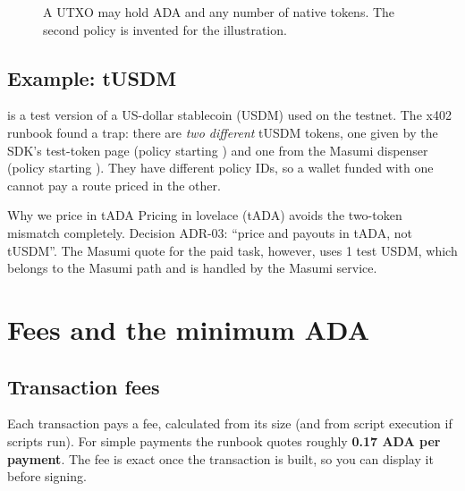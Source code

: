 \begin{figure}[h]
\centering
{}
\caption{A UTXO may hold ADA and any number of native tokens. The second policy is invented for the illustration.}
\end{figure}

\subsection{Example: tUSDM}
 is a test version of a US-dollar stablecoin (USDM) used on the testnet. The x402 runbook found a trap: there are \emph{two different} tUSDM tokens, one given by the SDK's test-token page (policy starting ) and one from the Masumi dispenser (policy starting ). They have different policy IDs, so a wallet funded with one cannot pay a route priced in the other.

\begin{shelfiebox}{Why we price in tADA}
Pricing in lovelace (tADA) avoids the two-token mismatch completely. Decision ADR-03: ``price and payouts in tADA, not tUSDM''. The Masumi quote for the paid task, however, uses 1 test USDM, which belongs to the Masumi path and is handled by the Masumi service.
\end{shelfiebox}

\section{Fees and the minimum ADA}

\subsection{Transaction fees}
Each transaction pays a fee, calculated from its size (and from script execution if scripts run). For simple payments the runbook quotes roughly \textbf{0.17 ADA per payment}. The fee is exact once the transaction is built, so you can display it before signing.

